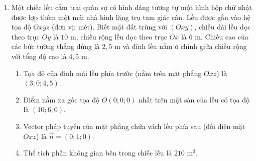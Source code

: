 \documentclass[12pt]{article}
\begin{document}
\begin{enumerate}[label=\textbf{Câu \arabic*:}, leftmargin=*]
\begin{figure}[H]
		\end{figure}
		
		\begin{enumerate}[label=\alph*)]
			\item Tọa độ của đỉnh $F$ nằm trên tường nhà kính là $(8; 0; 4)$.
			\item Tọa độ của điểm $C$ trên mặt sàn nhà kính là $(0; 6; 4)$.
			\item Chiều cao tổng thể của nhà kính tính từ mặt đất lên đến đỉnh mái là $6\text{ m}$.
			\item Gọi $\alpha$ là góc nghiêng của mặt mái phía trước $(PQFE)$ so với mặt phẳng ngang $(Oxy)$. Ta có $\cos \alpha \approx 0,832$ (làm tròn đến hàng phần nghìn).
		\end{enumerate}
		
		\vspace{3mm}
		\item Một chiếc lều cắm trại quân sự có hình dáng tương tự một hình hộp chữ nhật được lợp thêm một mái nhà hình lăng trụ tam giác cân. Lều được gắn vào hệ tọa độ $Oxyz$ (đơn vị: mét). Biết mặt đất trùng với $(Oxy)$, chiều dài lều dọc theo trục $Oy$ là $10\text{ m}$, chiều rộng lều dọc theo trục $Ox$ là $6\text{ m}$. Chiều cao của các bức tường thẳng đứng là $2,5\text{ m}$ và đỉnh lều nằm ở chính giữa chiều rộng với tổng độ cao là $4,5\text{ m}$.
		\begin{enumerate}[label=\alph*)]
			\item Tọa độ của đỉnh mái lều phía trước (nằm trên mặt phẳng $Oxz$) là $(3; 0; 4,5)$.
			\item Điểm nằm xa gốc tọa độ $O(0;0;0)$ nhất trên mặt sàn của lều có tọa độ là $(10; 6; 0)$.
			\item Vector pháp tuyến của mặt phẳng chứa vách lều phía sau (đối diện mặt $Oxz$) là $\vec{n} = (0; 1; 0)$.
			\item Thể tích phần không gian bên trong chiếc lều là $210\text{ m}^3$.
		\end{enumerate}
		

\end{enumerate}
\end{document}
